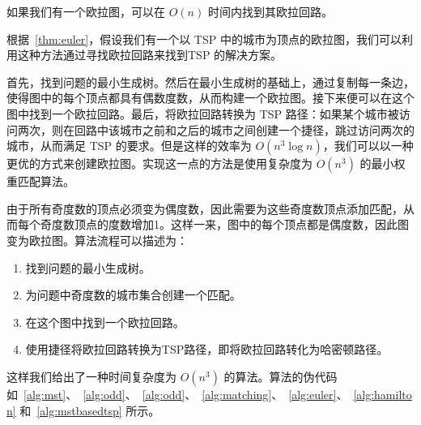 \begin{theorem}
    如果我们有一个欧拉图，可以在 $O(n)$ 时间内找到其欧拉回路。\label{thm:euler}
\end{theorem}

根据~\autoref{thm:euler}，假设我们有一个以 TSP 中的城市为顶点的欧拉图，我们可以利用这种方法通过寻找欧拉回路来找到TSP 的解决方案。

首先，找到问题的最小生成树。然后在最小生成树的基础上，通过复制每一条边，使得图中的每个顶点都具有偶数度数，从而构建一个欧拉图。接下来便可以在这个图中找到一个欧拉回路。最后，将欧拉回路转换为 TSP 路径：如果某个城市被访问两次，则在回路中该城市之前和之后的城市之间创建一个捷径，跳过访问两次的城市，从而满足 TSP 的要求。但是这样的效率为 $O(n^3\log n)$\cite{christofides2022worst}，我们可以以一种更优的方式来创建欧拉图。实现这一点的方法是使用复杂度为 $O(n^3)$ 的最小权重匹配算法。

由于所有奇度数的顶点必须变为偶度数，因此需要为这些奇度数顶点添加匹配，从而每个奇度数顶点的度数增加1。这样一来，图中的每个顶点都是偶度数，因此图变为欧拉图。算法流程可以描述为：\begin{enumerate}
    \item 找到问题的最小生成树。
    \item 为问题中奇度数的城市集合创建一个匹配。
    \item 在这个图中找到一个欧拉回路。
    \item 使用捷径将欧拉回路转换为TSP路径，即将欧拉回路转化为哈密顿路径。
\end{enumerate}

这样我们给出了一种时间复杂度为 $O(n^3)$ 的算法。算法的伪代码如~\autoref{alg:mst}、~\autoref{alg:odd}、~\autoref{alg:odd}、~\autoref{alg:matching}、~\autoref{alg:euler}、~\autoref{alg:hamilton} 和~\autoref{alg:mstbasedtsp} 所示。


